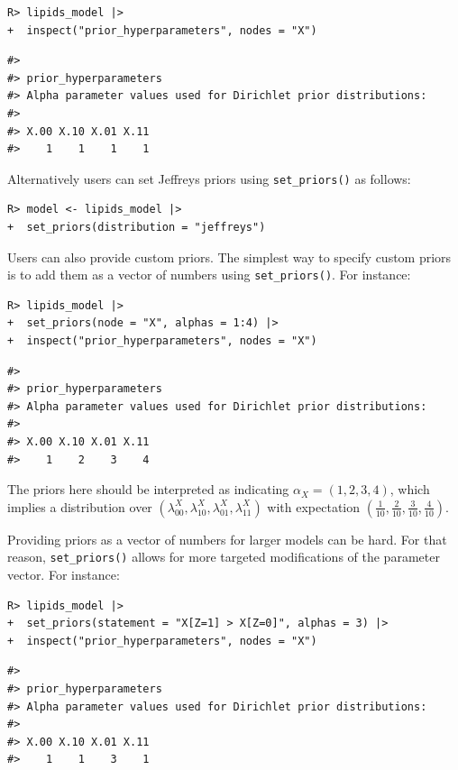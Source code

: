 \documentclass[
  11pt,
  article]{jss}
\begin{document}
\begin{verbatim}
R> lipids_model |> 
+  inspect("prior_hyperparameters", nodes = "X") 
\end{verbatim}

\begin{verbatim}
#> 
#> prior_hyperparameters
#> Alpha parameter values used for Dirichlet prior distributions:
#> 
#> X.00 X.10 X.01 X.11 
#>    1    1    1    1
\end{verbatim}

Alternatively users can set Jeffreys priors using \texttt{set\_priors()}
as follows:

\begin{verbatim}
R> model <- lipids_model |> 
+  set_priors(distribution = "jeffreys")
\end{verbatim}

Users can also provide custom priors. The simplest way to specify custom
priors is to add them as a vector of numbers using
\texttt{set\_priors()}. For instance:

\begin{verbatim}
R> lipids_model |> 
+  set_priors(node = "X", alphas = 1:4) |> 
+  inspect("prior_hyperparameters", nodes = "X")
\end{verbatim}

\begin{verbatim}
#> 
#> prior_hyperparameters
#> Alpha parameter values used for Dirichlet prior distributions:
#> 
#> X.00 X.10 X.01 X.11 
#>    1    2    3    4
\end{verbatim}

The priors here should be interpreted as indicating
\(\alpha_X = (1, 2, 3, 4)\), which implies a distribution over
\((\lambda^X_{00},\lambda^X_{10}, \lambda^X_{01}, \lambda^X_{11})\) with
expectation
\(\left(\frac{1}{10}, \frac{2}{10}, \frac{3}{10}, \frac{4}{10} \right)\).

Providing priors as a vector of numbers for larger models can be hard.
For that reason, \texttt{set\_priors()} allows for more targeted
modifications of the parameter vector. For instance:

\begin{verbatim}
R> lipids_model |>
+  set_priors(statement = "X[Z=1] > X[Z=0]", alphas = 3) |>
+  inspect("prior_hyperparameters", nodes = "X")
\end{verbatim}

\begin{verbatim}
#> 
#> prior_hyperparameters
#> Alpha parameter values used for Dirichlet prior distributions:
#> 
#> X.00 X.10 X.01 X.11 
#>    1    1    3    1
\end{verbatim}
\end{document}
